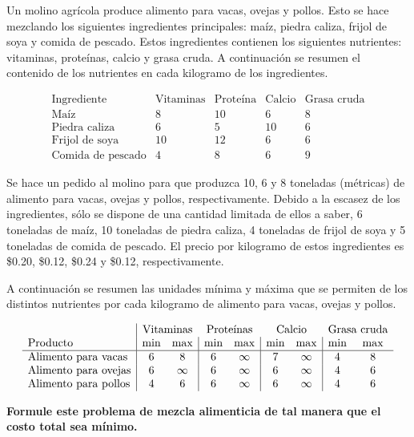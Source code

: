 \begin{Ejer} Un molino agr\'icola produce alimento para vacas, ovejas y pollos. Esto se hace mezclando los siguientes ingredientes principales: ma\'iz, piedra caliza, frijol de soya y comida de pescado. Estos ingredientes contienen los siguientes nutrientes: vitaminas, prote\'inas, calcio y grasa cruda. A continuaci\'on se resumen el contenido de los nutrientes en cada kilogramo de los ingredientes.

\[
\begin{array}{l|cccc}
\text{Ingrediente} & \text{Vitaminas} & \text{Prote\'ina} & \text{Calcio} & \text{Grasa cruda} \\
\hline
\text{Ma\'iz} & 8 & 10 & 6 & 8 \\
\text{Piedra caliza} & 6 & 5 & 10 & 6 \\
\text{Frijol de soya} & 10 & 12 & 6 & 6 \\
\text{Comida de pescado} & 4 & 8 & 6 & 9
\end{array}
\]

Se hace un pedido al molino para que produzca 10, 6 y 8 toneladas (m\'etricas) de alimento para vacas, ovejas y pollos, respectivamente. Debido a la escasez de los ingredientes, s\'olo se dispone de una cantidad limitada de ellos a saber, 6 toneladas de ma\'iz, 10 toneladas de piedra caliza, 4 toneladas de frijol de soya y 5 toneladas de comida de pescado. El precio por kilogramo de estos ingredientes es \$0.20, \$0.12, \$0.24 y \$0.12, respectivamente.

A continuaci\'on se resumen las unidades m\'inima y m\'axima que se permiten de los distintos nutrientes por cada kilogramo de alimento para vacas, ovejas y pollos.

\[
\begin{array}{l|cc|cc|cc|cc}
 & \multicolumn{2}{c}{\text{Vitaminas}} & \multicolumn{2}{c}{\text{Prote\'inas}} & \multicolumn{2}{c}{\text{Calcio}} & \multicolumn{2}{c}{\text{Grasa cruda}} \\
\text{Producto} & \min & \max & \min & \max & \min & \max & \min & \max \\
\hline
\text{Alimento para vacas} & 6 & 8 & 6 & \infty & 7 & \infty & 4 & 8 \\
\text{Alimento para ovejas} & 6 & \infty & 6 & \infty & 6 & \infty & 4 & 6 \\
\text{Alimento para pollos} & 4 & 6 & 6 & \infty & 6 & \infty & 4 & 6
\end{array}
\]

\textbf{Formule este problema de mezcla alimenticia de tal manera que el costo total sea m\'inimo.}
\end{Ejer}

